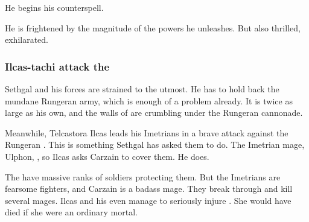 He begins his counterspell. 


He is frightened by the magnitude of the powers he unleashes. 
But also thrilled, exhilarated.






\subsubsection{Ilcas-tachi attack the \ishrah}
Sethgal and his forces are strained to the utmost.
He has to hold back the mundane Rungeran army, which is enough of a problem already.
It is twice as large as his own, and the walls of \Forclin are crumbling under the Rungeran cannonade. 

Meanwhile, Telcastora Ilcas leads his Imetrians in a brave attack against the Rungeran \ishrah.
This is something Sethgal has asked them to do. 
The Imetrian mage, Ulphon, , so Ilcas asks Carzain to cover them. 
He does. 

The \ishrah have massive ranks of soldiers protecting them.
But the Imetrians are fearsome fighters, and Carzain is a badass mage.
They break through and kill several mages. 
Ilcas and his \nycans even manage to seriously injure \Takestsha. 
She would have died if she were an ordinary mortal. 

